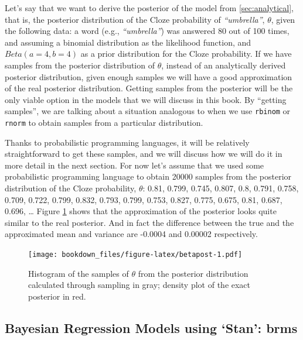\documentclass[12pt,]{krantz}
\theoremstyle{definition}
\theoremstyle{definition}
\theoremstyle{definition}
\theoremstyle{remark}
\begin{document}
Let's say that we want to derive the posterior of the model from \ref{sec:analytical}, that is, the posterior distribution of the Cloze probability of \emph{``umbrella''}, \(\theta\), given the following data: a word (e.g., \emph{``umbrella''}) was answered 80 out of 100 times, and assuming a binomial distribution as the likelihood function, and \(Beta(a=4,b=4)\) as a prior distribution for the Cloze probability. If we have samples from the posterior distribution of \(\theta\), instead of an analytically derived posterior distribution, given enough samples we will have a good approximation of the real posterior distribution. Getting samples from the posterior will be the only viable option in the models that we will discuss in this book. By ``getting samples'', we are talking about a situation analogous to when we use \texttt{rbinom} or \texttt{rnorm} to obtain samples from a particular distribution.

Thanks to probabilistic programming languages, it will be relatively straightforward to get these samples, and we will discuss how we will do it in more detail in the next section. For now let's assume that we used some probabilistic programming language to obtain 20000 samples from the posterior distribution of the Cloze probability, \(\theta\): 0.81, 0.799, 0.745, 0.807, 0.8, 0.791, 0.758, 0.709, 0.722, 0.799, 0.832, 0.793, 0.799, 0.753, 0.827, 0.775, 0.675, 0.81, 0.687, 0.696, \ldots{} Figure \ref{fig:betapost} shows that the approximation of the posterior looks quite similar to the real posterior. And in fact the difference between the true and the approximated mean and variance are -0.0004 and 0.00002 respectively.



\begin{figure}
\centering
\texttt{[image: bookdown\_files/figure-latex/betapost-1.pdf]}
\caption{\label{fig:betapost}Histogram of the samples of \(\theta\) from the posterior distribution calculated through sampling in gray; density plot of the exact posterior in red.}
\end{figure}

\hypertarget{bayesian-regression-models-using-stan-brms}{%
\subsection{Bayesian Regression Models using `Stan': brms}\label{bayesian-regression-models-using-stan-brms}}
\end{document}
